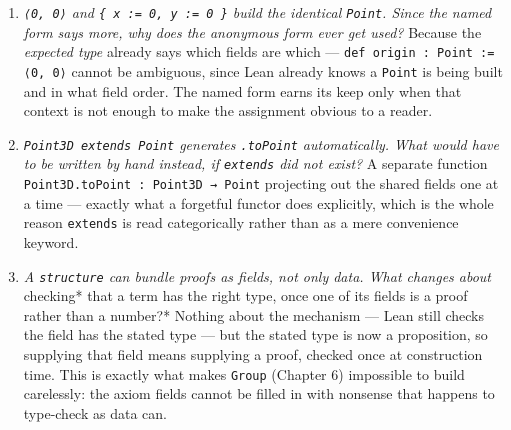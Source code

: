 \begin{enumerate}
\def\labelenumi{\arabic{enumi}.}
\tightlist
\item
  \emph{\texttt{⟨0, 0⟩} and \texttt{\{ x := 0, y := 0 \}} build the identical \texttt{Point}. Since the named form says more, why does the anonymous form ever get used?} Because the \emph{expected type} already says which fields are which --- \texttt{def origin : Point := ⟨0, 0⟩} cannot be ambiguous, since Lean already knows a \texttt{Point} is being built and in what field order. The named form earns its keep only when that context is not enough to make the assignment obvious to a reader.
\item
  \emph{\texttt{Point3D extends Point} generates \texttt{.toPoint} automatically. What would have to be written by hand instead, if \texttt{extends} did not exist?} A separate function \texttt{Point3D.toPoint : Point3D → Point} projecting out the shared fields one at a time --- exactly what a forgetful functor does explicitly, which is the whole reason \texttt{extends} is read categorically rather than as a mere convenience keyword.
\item
  \emph{A \texttt{structure} can bundle proofs as fields, not only data. What changes about }checking* that a term has the right type, once one of its fields is a proof rather than a number?* Nothing about the mechanism --- Lean still checks the field has the stated type --- but the stated type is now a proposition, so supplying that field means supplying a proof, checked once at construction time. This is exactly what makes \texttt{Group} (Chapter 6) impossible to build carelessly: the axiom fields cannot be filled in with nonsense that happens to type-check as data can.
\end{enumerate}

